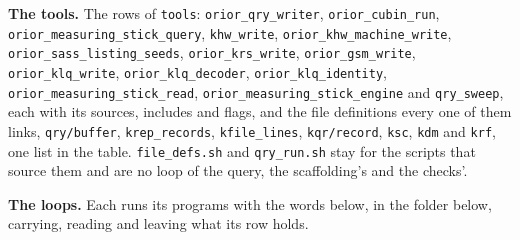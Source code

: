 \textbf{The tools.} The rows of \texttt{tools}: \texttt{orior\_\allowbreak{}qry\_\allowbreak{}writer}, \texttt{orior\_\allowbreak{}cubin\_\allowbreak{}run}, \texttt{orior\_\allowbreak{}measuring\_\allowbreak{}stick\_\allowbreak{}query}, \texttt{khw\_\allowbreak{}write}, \texttt{orior\_\allowbreak{}khw\_\allowbreak{}machine\_\allowbreak{}write}, \texttt{orior\_\allowbreak{}sass\_\allowbreak{}listing\_\allowbreak{}seeds}, \texttt{orior\_\allowbreak{}krs\_\allowbreak{}write}, \texttt{orior\_\allowbreak{}gsm\_\allowbreak{}write}, \texttt{orior\_\allowbreak{}klq\_\allowbreak{}write}, \texttt{orior\_\allowbreak{}klq\_\allowbreak{}decoder}, \texttt{orior\_\allowbreak{}klq\_\allowbreak{}identity}, \texttt{orior\_\allowbreak{}measuring\_\allowbreak{}stick\_\allowbreak{}read}, \texttt{orior\_\allowbreak{}measuring\_\allowbreak{}stick\_\allowbreak{}engine} and \texttt{qry\_\allowbreak{}sweep}, each with its sources, includes and flags, and the file definitions every one of them links, \texttt{qry/\allowbreak{}buffer}, \texttt{krep\_\allowbreak{}records}, \texttt{kfile\_\allowbreak{}lines}, \texttt{kqr/\allowbreak{}record}, \texttt{ksc}, \texttt{kdm} and \texttt{krf}, one list in the table. \texttt{file\_\allowbreak{}defs.\allowbreak{}sh} and \texttt{qry\_\allowbreak{}run.\allowbreak{}sh} stay for the scripts that source them and are no loop of the query, the scaffolding's and the checks'.

\textbf{The loops.} Each runs its programs with the words below, in the folder below, carrying, reading and leaving what its row holds.

